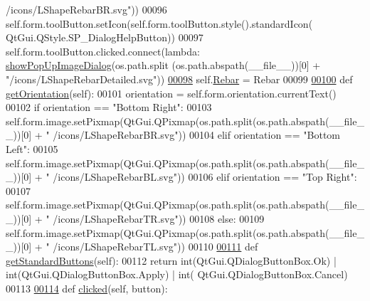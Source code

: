 \begin{DoxyCode}
{      /icons/LShapeRebarBR.svg"}))
00096         self.form.toolButton.setIcon(self.form.toolButton.style().standardIcon(
      QtGui.QStyle.SP\_DialogHelpButton))
00097         self.form.toolButton.clicked.connect(\textcolor{keyword}{lambda}: \hyperlink{namespacePopUpImage_a8c565620d7de9b4882a44eacb870ad05}{showPopUpImageDialog}(os.path.split
      (os.path.abspath(\_\_file\_\_))[0] + \textcolor{stringliteral}{"/icons/LShapeRebarDetailed.svg"}))
\hypertarget{LShapeRebar_8py_source.tex_l00098}{}\hyperlink{classLShapeRebar_1_1__LShapeRebarTaskPanel_a4a64ebfb73de83fd42f3a349272e69c7}{00098}         self.\hyperlink{classLShapeRebar_1_1__LShapeRebarTaskPanel_a4a64ebfb73de83fd42f3a349272e69c7}{Rebar} = Rebar
00099 
\hypertarget{LShapeRebar_8py_source.tex_l00100}{}\hyperlink{classLShapeRebar_1_1__LShapeRebarTaskPanel_a1e13b2224b0ea68b9519c094004087ae}{00100}     \textcolor{keyword}{def }\hyperlink{classLShapeRebar_1_1__LShapeRebarTaskPanel_a1e13b2224b0ea68b9519c094004087ae}{getOrientation}(self):
00101         orientation = self.form.orientation.currentText()
00102         \textcolor{keywordflow}{if} orientation == \textcolor{stringliteral}{"Bottom Right"}:
00103             self.form.image.setPixmap(QtGui.QPixmap(os.path.split(os.path.abspath(\_\_file\_\_))[0] + \textcolor{stringliteral}{"
      /icons/LShapeRebarBR.svg"}))
00104         \textcolor{keywordflow}{elif} orientation == \textcolor{stringliteral}{"Bottom Left"}:
00105             self.form.image.setPixmap(QtGui.QPixmap(os.path.split(os.path.abspath(\_\_file\_\_))[0] + \textcolor{stringliteral}{"
      /icons/LShapeRebarBL.svg"}))
00106         \textcolor{keywordflow}{elif} orientation == \textcolor{stringliteral}{"Top Right"}:
00107             self.form.image.setPixmap(QtGui.QPixmap(os.path.split(os.path.abspath(\_\_file\_\_))[0] + \textcolor{stringliteral}{"
      /icons/LShapeRebarTR.svg"}))
00108         \textcolor{keywordflow}{else}:
00109             self.form.image.setPixmap(QtGui.QPixmap(os.path.split(os.path.abspath(\_\_file\_\_))[0] + \textcolor{stringliteral}{"
      /icons/LShapeRebarTL.svg"}))
00110 
\hypertarget{LShapeRebar_8py_source.tex_l00111}{}\hyperlink{classLShapeRebar_1_1__LShapeRebarTaskPanel_a8f2f249515b279322dfeeab94cd4395b}{00111}     \textcolor{keyword}{def }\hyperlink{classLShapeRebar_1_1__LShapeRebarTaskPanel_a8f2f249515b279322dfeeab94cd4395b}{getStandardButtons}(self):
00112         \textcolor{keywordflow}{return} int(QtGui.QDialogButtonBox.Ok) | int(QtGui.QDialogButtonBox.Apply) | int(
      QtGui.QDialogButtonBox.Cancel)
00113 
\hypertarget{LShapeRebar_8py_source.tex_l00114}{}\hyperlink{classLShapeRebar_1_1__LShapeRebarTaskPanel_ac477e2a29da1e0ac71bf2d3aa1e50c4f}{00114}     \textcolor{keyword}{def }\hyperlink{classLShapeRebar_1_1__LShapeRebarTaskPanel_ac477e2a29da1e0ac71bf2d3aa1e50c4f}{clicked}(self, button):

\end{DoxyCode}
